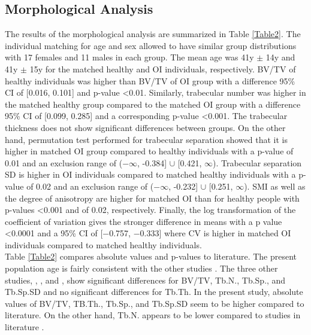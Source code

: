 \documentclass[a4paper,fleqn]{DC_ArtStyle}
\begin{document}
\subsection{Morphological Analysis}
The results of the morphological analysis are summarized in Table \ref{Table2}. The individual matching for age and sex allowed to have similar group distributions with 17 females and 11 males in each group. The mean age was 41y $\pm$ 14y and 41y $\pm$ 15y for the mat\-ched healthy and OI individuals, respectively. BV/TV of healthy individuals was higher than BV/TV of OI group with a difference 95\% CI of [0.016, 0.101] and p-value <0.01. Similarly, trabecular number was higher in the matched healthy group compared to the matched OI group with a difference 95\% CI of [0.099, 0.285] and a corresponding p-value <0.001. The trabecular thickness does not show significant differences between groups. On the other hand, permutation test performed for trabecular separation showed that it is higher in mat\-ched OI group compared to healthy individuals with a p-value of 0.01 and an exclusion range of ($-\infty$, -0.384] $\cup$ [0.421, $\infty$). Trabecular separation SD is higher in OI individuals compared to matched healthy individuals with a p-value of 0.02 and an exclusion range of ($-\infty$, -0.232] $\cup$ [0.251, $\infty$). SMI as well as the degree of anisotropy are higher for matched OI than for healthy people with p-values <0.001 and of 0.02, respectively. Finally, the log transformation of the coefficient of variation gives the stronger difference in means with a p value <0.0001 and a 95\% CI of [−0.757, −0.333] where CV is higher in matched OI individuals compared to matched healthy individuals.\\

Table \ref{Table2} compares absolute values and p-values to literature. The present population age is fairly consistent with the other studies \cite{Folkestad2012,Kocijan2015,Rolvien2018}. The three other studies,  \citeauthor{Folkestad2012}\cite{Folkestad2012}, \citeauthor{Kocijan2015}\cite{Kocijan2015}, and \citeauthor{Rolvien2018}\cite{Rolvien2018}, show significant differences for BV/TV, Tb.N., Tb.Sp., and Tb.Sp.SD and no significant differences for Tb.Th. In the present study, absolute values of BV/TV, TB.Th., Tb.Sp., and Tb.Sp.SD seem to be higher compared to literature. On the other hand, Tb.N. appears to be lower compared to studies in literature \cite{Folkestad2012,Kocijan2015,Rolvien2018}.
\end{document}
